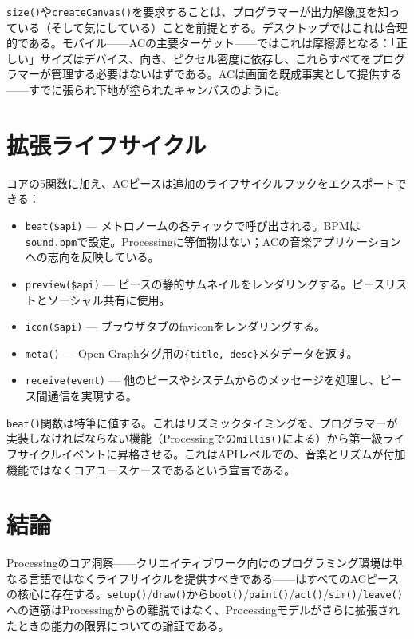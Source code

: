 \documentclass[10pt,letterpaper,twocolumn]{article}
\begin{document}
\texttt{size()}や\texttt{createCanvas()}を要求することは、プログラマーが出力解像度を知っている（そして気にしている）ことを前提とする。デスクトップではこれは合理的である。モバイル——ACの主要ターゲット——ではこれは摩擦源となる：「正しい」サイズはデバイス、向き、ピクセル密度に依存し、これらすべてをプログラマーが管理する必要はないはずである。ACは画面を既成事実として提供する——すでに張られ下地が塗られたキャンバスのように。


\section{拡張ライフサイクル}
\label{sec:extended}

コアの5関数に加え、ACピースは追加のライフサイクルフックをエクスポートできる：

\begin{itemize}
  \item \texttt{beat(\$api)} --- メトロノームの各ティックで呼び出される。BPMは\texttt{sound.bpm}で設定。Processingに等価物はない；ACの音楽アプリケーションへの志向を反映している。
  \item \texttt{preview(\$api)} --- ピースの静的サムネイルをレンダリングする。ピースリストとソーシャル共有に使用。
  \item \texttt{icon(\$api)} --- ブラウザタブのfaviconをレンダリングする。
  \item \texttt{meta()} --- Open Graphタグ用の\texttt{\{title, desc\}}メタデータを返す。
  \item \texttt{receive(event)} --- 他のピースやシステムからのメッセージを処理し、ピース間通信を実現する。
\end{itemize}

\texttt{beat()}関数は特筆に値する。これはリズミックタイミングを、プログラマーが実装しなければならない機能（Processingでの\texttt{millis()}による）から第一級ライフサイクルイベントに昇格させる。これはAPIレベルでの、音楽とリズムが付加機能ではなくコアユースケースであるという宣言である。


\section{結論}
\label{sec:conclusion}

Processingのコア洞察——クリエイティブワーク向けのプログラミング環境は単なる言語ではなくライフサイクルを提供すべきである——はすべてのACピースの核心に存在する。\texttt{setup()}/\texttt{draw()}から\texttt{boot()}/\texttt{paint()}/\texttt{act()}/\texttt{sim()}/\texttt{leave()}への道筋はProcessingからの離脱ではなく、Processingモデルがさらに拡張されたときの能力の限界についての論証である。
\end{document}
